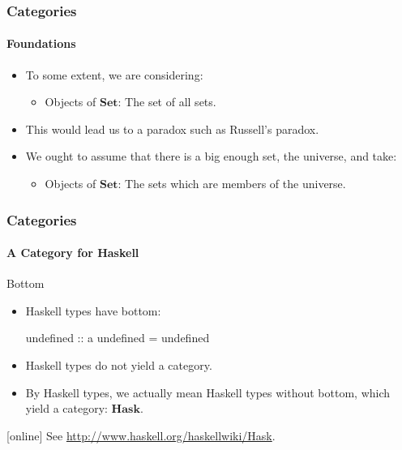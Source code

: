 \documentclass{beamer}
\newcommand{\catbf}[1]{\ensuremath{\mathbf{#1}}\xspace}
\newcommand{\hask}{\catbf{Hask}}
\newcommand{\set}{\catbf{Set}}
\begin{document}
\begin{frame}[label={re:foundations}]
  \frametitle{Categories}
  \framesubtitle{Foundations}

  \begin{itemize}
  \item
    To some extent, we are considering:
    \begin{itemize}
    \item
      Objects of \set: The set of all sets.
    \end{itemize}
  \item
    This would lead us to a paradox such as Russell's paradox.
  \end{itemize}
  \begin{itemize}
  \item
    We ought to assume that there is a big enough set, the universe,
    and take:
    \begin{itemize}
    \item
      Objects of \set: The sets which are members of the universe.
    \end{itemize}
  \end{itemize}

\end{frame}


\begin{frame}[fragile,label={re:hask}]
  \frametitle{Categories}
  \framesubtitle{A Category for Haskell}

  \begin{block}{Bottom}
    \begin{itemize}
    \item
      Haskell types have bottom:
      \begin{code}
undefined :: a
undefined = undefined
      \end{code}
    \item
      Haskell types do not yield a category.
    \end{itemize}
    \begin{itemize}
    \item
      By Haskell types, we actually mean Haskell types without bottom,
      which yield a category: \hask.
    \end{itemize}
    \begin{thebibliography}{}
    [online]
    \bibitem[]{}
      \newblock See \url{http://www.haskell.org/haskellwiki/Hask}.
    \end{thebibliography}
    \vfill\hfill\hyperlink{bottom}{}
  \end{block}

\end{frame}
\end{document}
